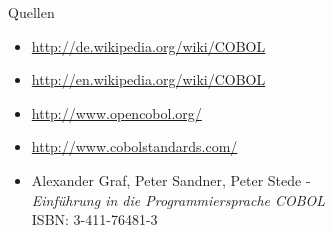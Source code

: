 \begin{slide}{Quellen}
	\begin{itemize}
		\item{\url{http://de.wikipedia.org/wiki/COBOL}}
		\item{\url{http://en.wikipedia.org/wiki/COBOL}}
		\item{\url{http://www.opencobol.org/}}
		\item{\url{http://www.cobolstandards.com/}}
		\item{Alexander Graf, Peter Sandner, Peter Stede - \\
			\textit{Einführung in die Programmiersprache COBOL}\\
			ISBN: 3-411-76481-3}
	\end{itemize}
\end{slide}
